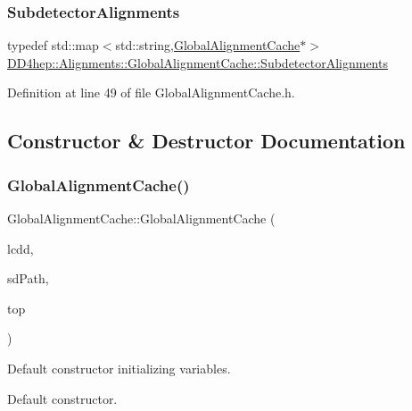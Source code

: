 \subsubsection{\texorpdfstring{Subdetector\+Alignments}{SubdetectorAlignments}}
{\footnotesize\ttfamily typedef std\+::map$<$std\+::string,\hyperlink{class_d_d4hep_1_1_alignments_1_1_global_alignment_cache}{Global\+Alignment\+Cache}$\ast$$>$ \hyperlink{class_d_d4hep_1_1_alignments_1_1_global_alignment_cache_abedb85cf969b8fb161695f5eca9717bc}{D\+D4hep\+::\+Alignments\+::\+Global\+Alignment\+Cache\+::\+Subdetector\+Alignments}}



Definition at line 49 of file Global\+Alignment\+Cache.\+h.



\subsection{Constructor \& Destructor Documentation}
\hypertarget{class_d_d4hep_1_1_alignments_1_1_global_alignment_cache_a0db78280bbba5f647f0602a0a354ed52}{}\label{class_d_d4hep_1_1_alignments_1_1_global_alignment_cache_a0db78280bbba5f647f0602a0a354ed52} 
\subsubsection{\texorpdfstring{Global\+Alignment\+Cache()}{GlobalAlignmentCache()}}
{\footnotesize\ttfamily Global\+Alignment\+Cache\+::\+Global\+Alignment\+Cache (\begin{DoxyParamCaption}\item[{\hyperlink{class_d_d4hep_1_1_geometry_1_1_l_c_d_d}{L\+C\+DD} \&}]{lcdd,  }\item[{const std\+::string \&}]{sd\+Path,  }\item[{bool}]{top }\end{DoxyParamCaption})\hspace{0.3cm}{\ttfamily [protected]}}



Default constructor initializing variables. 

Default constructor. 


